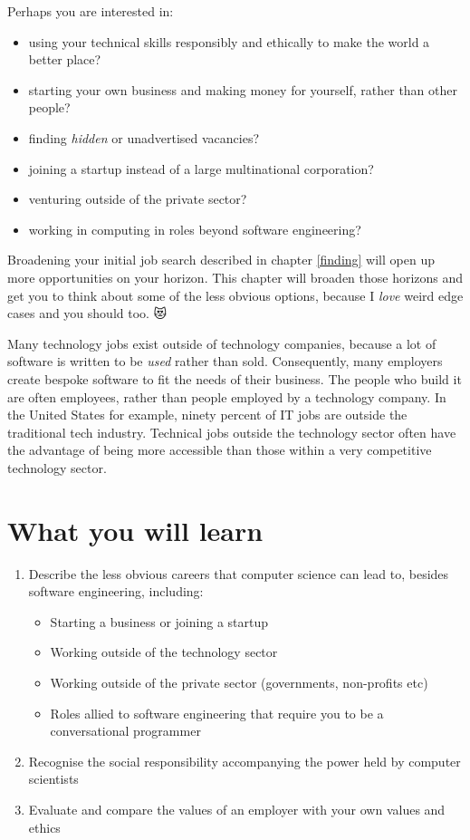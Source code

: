 \documentclass[
]{book}
\providecommand{\tightlist}{%
  \setlength{\itemsep}{0pt}\setlength{\parskip}{0pt}}
\begin{document}
Perhaps you are interested in:

\begin{itemize}
\tightlist
\item
  using your technical skills responsibly and ethically to make the world a better place?
\item
  starting your own business and making money for yourself, rather than other people?
\item
  finding \emph{hidden} or unadvertised vacancies?
\item
  joining a startup instead of a large multinational corporation?
\item
  venturing outside of the private sector?
\item
  working in computing in roles beyond software engineering?
\end{itemize}

Broadening your initial job search described in chapter \ref{finding} will open up more opportunities on your horizon. This chapter will broaden those horizons and get you to think about some of the less obvious options, because I \emph{love} weird edge cases and you should too. 😻

Many technology jobs exist outside of technology companies, \citep{outsideit} because a lot of software is written to be \emph{used} rather than sold. Consequently, many employers create bespoke software to fit the needs of their business. The people who build it are often employees, rather than people employed by a technology company. In the United States for example, ninety percent of IT jobs are outside the traditional tech industry. Technical jobs outside the technology sector often have the advantage of being more accessible than those within a very competitive technology sector. \citep{burninglass}

\hypertarget{ilo11}{%
\section{What you will learn}\label{ilo11}}

\begin{enumerate}
\def\labelenumi{\arabic{enumi}.}
\tightlist
\item
  Describe the less obvious careers that computer science can lead to, besides software engineering, including:

  \begin{itemize}
  \tightlist
  \item
    Starting a business or joining a startup
  \item
    Working outside of the technology sector
  \item
    Working outside of the private sector (governments, non-profits etc)
  \item
    Roles allied to software engineering that require you to be a conversational programmer
  \end{itemize}
\item
  Recognise the social responsibility accompanying the power held by computer scientists
\item
  Evaluate and compare the values of an employer with your own values and ethics
\end{enumerate}
\end{document}
